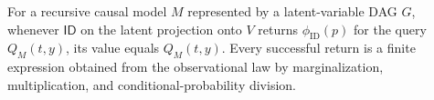 For a recursive causal model \(M\) represented by a latent-variable DAG \(G\), whenever \(\mathsf{ID}\) on the latent projection onto \(V\) returns \(\phi_{\mathrm{ID}}(p)\) for the query \(Q_M(t,y)\), its value equals \(Q_M(t,y)\).  Every successful return is a finite expression obtained from the observational law by marginalization, multiplication, and conditional-probability division.